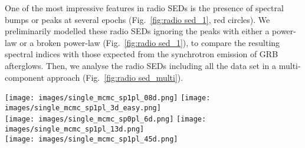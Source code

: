 \documentclass{aa}
\begin{document}
One of the most impressive features in radio SEDs is the presence of spectral bumps or peaks at several epochs (Fig.~\ref{fig:radio sed_1}, red circles).
We preliminarily modelled these radio SEDs ignoring the peaks with either a power-law or a broken power-law (Fig.~\ref{fig:radio sed_1}), to compare the resulting spectral indices with those expected from the synchrotron emission of GRB afterglows.
Then, we analyse the radio SEDs including all the data set in a multi-component approach (Fig.~\ref{fig:radio sed_multi}).
%
\begin{figure*} %
\centering
{\texttt{[image: images/single\_mcmc\_sp1pl\_08d.png]}} \quad
{\texttt{[image: images/single\_mcmc\_sp1pl\_3d\_easy.png]}} \\
{\texttt{[image: images/single\_mcmc\_sp0pl\_6d.png]}} \quad
{\texttt{[image: images/single\_mcmc\_sp1pl\_13d.png]}} \\
{\texttt{[image: images/single\_mcmc\_sp1pl\_45d.png]}} \quad
\caption{Radio SEDs of GRB\,160131A from $0.8$ to $44.8$~d.
Top left: data together with a BPL (Eq.~\ref{eq:pl1}) at $0.8$~d; red points identify the bump and were ignored by the fit.
Top right: radio SED at $2.7$~d fitted with a BPL.
Middle left: data together with an empirical SPL (Eq.~\ref{eq:pl0}) at $5.8$~d; red points identify the bump $\sim 8$~GHz and were ignored by the fit.
Middle right: radio SED at $12.7$~d fitted with a BPL.
Bottom: data together with a BPL (Eq.~\ref{eq:pl1}) at $44.8$~d.
Green dashed lines show the resulting modelling.
Filled circles indicate detections, and upside down triangles indicate $3\sigma$ upper limits.
}
\label{fig:radio sed_1}
\end{figure*}
%
\end{document}
